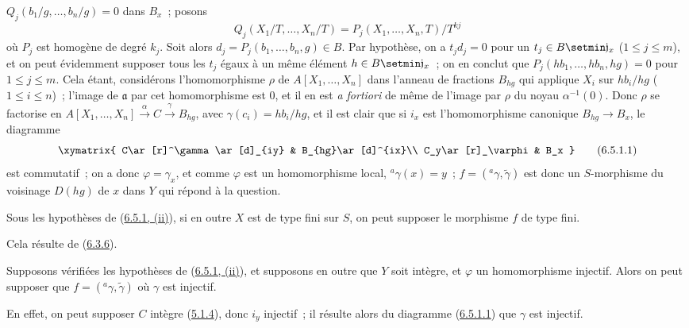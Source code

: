 \begin{enumerate}
    $Q_j(b_1/g,\ldots,b_n/g)=0$ dans $B_x$~; posons
    \[
      Q_j(X_1/T,\ldots,X_n/T)
      =P_j(X_1,\ldots,X_n,T)/T^{kj}
    \]
    où $P_j$ est homogène de degré $k_j$. Soit alors
    $d_j=P_j(b_1,\ldots,b_n,g)\in B$. Par hypothèse, on a $t_jd_j=0$ pour un
    $t_j\in B\setmin\mathfrak{j}_x$ ($1\leq j\leq m$), et on peut évidemment
    supposer tous les $t_j$
    égaux à un même élément $h\in B\setmin\mathfrak{j}_x$~; on en conclut que
    $P_j(hb_1,\ldots,hb_n,hg)=0$ pour $1\leq j\leq m$. Cela étant, considérons
    l'homomorphisme $\rho$ de $A[X_1,\ldots,X_n]$ dans l'anneau de fractions
    $B_{hg}$ qui applique $X_i$ sur $hb_i/hg$ ($1\leq i\leq n$)~; l'image de
    $\mathfrak{a}$ par cet homomorphisme est 0, et il en est \emph{a fortiori}
    de même de l'image par $\rho$ du noyau $\alpha^{-1}(0)$. Donc $\rho$ se
    factorise en
    $A[X_1,\ldots,X_n]\xrightarrow{\alpha}C\xrightarrow{\gamma}B_{hg}$, avec
    $\gamma(c_i)=hb_i/hg$, et il est clair que si $i_x$ est l'homomorphisme
    canonique $B_{hg}\to B_x$, le diagramme
    \[
      \xymatrix{
        C\ar[r]^\gamma\ar[d]_{iy} & B_{hg}\ar[d]^{ix}\\
        C_y\ar[r]_\varphi & B_x
      }
      \tag{6.5.1.1}\label{I.6.5.1.1-fr}
    \]
    est commutatif~; on a donc $\varphi=\gamma_x$, et comme $\varphi$ est un
    homomorphisme local, ${}^a\gamma(x)=y$~; $f=({}^a\gamma,\widetilde{\gamma})$
    est donc un $S$-morphisme du voisinage $D(hg)$ de $x$ dans $Y$ qui répond à
    la question.
\end{enumerate}

\begin{corollary}[6.5.2]
\label{I.6.5.2-fr}
Sous les hypothèses de \textup{(\hyperref[I.6.5.1-fr]{6.5.1, (ii)})}, si en outre $X$
est de type fini sur $S$, on peut supposer le morphisme $f$ de type fini.
\end{corollary}

Cela résulte de (\hyperref[I.6.3.6-fr]{6.3.6}).

\begin{corollary}[6.5.3]
\label{I.6.5.3-fr}
Supposons vérifiées les hypothèses de
\textup{(\hyperref[I.6.5.1-fr]{6.5.1, (ii)})}, et supposons en outre que $Y$ soit
intègre, et $\varphi$ un homomorphisme injectif. Alors on peut supposer que
$f=({}^a\gamma,\widetilde{\gamma})$ où $\gamma$ est injectif.
\end{corollary}

En effet, on peut supposer $C$ intègre
(\hyperref[I.5.1.4-fr]{5.1.4}), donc $i_y$ injectif~; il résulte alors du
diagramme (\hyperref[I.6.5.1.1-fr]{6.5.1.1}) que $\gamma$ est injectif.

